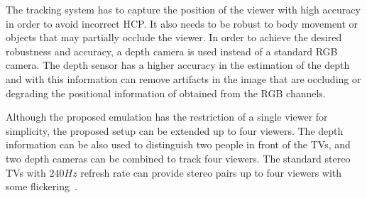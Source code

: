 The tracking system has to capture the position of the viewer with high accuracy in order to avoid incorrect HCP. It also needs to be robust to body movement or objects that may partially occlude the viewer. In order to achieve the desired robustness and accuracy, a depth camera is used instead of a standard RGB camera. The depth sensor has a higher accuracy in the estimation of the depth and with this information can remove artifacts in the image that are occluding or degrading the positional information of obtained from the RGB channels. 

Although the proposed emulation has the restriction of a single viewer for simplicity, the proposed setup can be extended up to four viewers. The depth information can be also used to distinguish two people in front of the TVs, and two depth cameras can be combined to track four viewers. The standard stereo TVs with $240Hz$ refresh rate can provide stereo pairs up to four viewers with some flickering~\cite{Frohlich2005}. 






